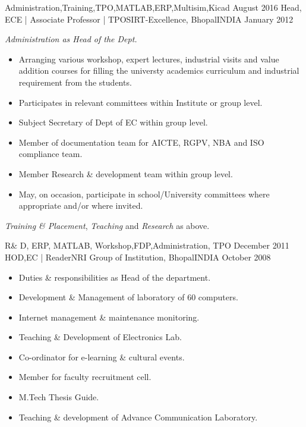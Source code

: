 \begin{experiences}
{\begin{itemize}
                  \end{itemize}
                    }
                    {Administration,Training,TPO,MATLAB,ERP,Multisim,Kicad }
  \emptySeparator
  \experience
    {August 2016} {Head, ECE | Associate Professor | TPO}{SIRT-Excellence, Bhopal}{INDIA}
    {January 2012}    {
                     	\textit{Administration as Head of the Dept.}
                     \begin{itemize}
                     	\item Arranging various workshop, expert lectures, industrial visits and value addition courses for filling the universty academics curriculum and industrial requirement from the students.
                     	
                     	\item Participates in relevant committees within Institute or group level.  
                     	
                     	\item Subject Secretary of Dept of EC within group level.        
                     	
                     	\item Member of documentation team for AICTE, RGPV, NBA and ISO compliance team.
                     	
                     	\item Member Research \& development team within group level.     
                     	
                     	\item May, on occasion, participate in school/University committees where appropriate and/or where invited.  
                     \end{itemize}
                     \textit{Training \& Placement}, \textit{Teaching} and \textit{Research }as above.
                    }
                    {R\& D, ERP, MATLAB, Workshop,FDP,Administration, TPO}
  \emptySeparator
  \experience
    {December 2011}     {HOD,EC | Reader}{NRI Group of Institution, Bhopal}{INDIA}
    {October 2008}    {
                      \begin{itemize}
                        \item Duties \& responsibilities as Head of the department.
                        \item Development \& Management of laboratory of 60 computers.
                        \item Internet management \& maintenance monitoring.
                        \item Teaching \& Development of Electronics Lab.
                        \item Co-ordinator for e-learning \& cultural events.
                        \item Member for faculty recruitment cell.
                        \item M.Tech Thesis Guide.
                        \item Teaching \& development of Advance Communication Laboratory.
                        

\end{itemize}}
\end{experiences}
